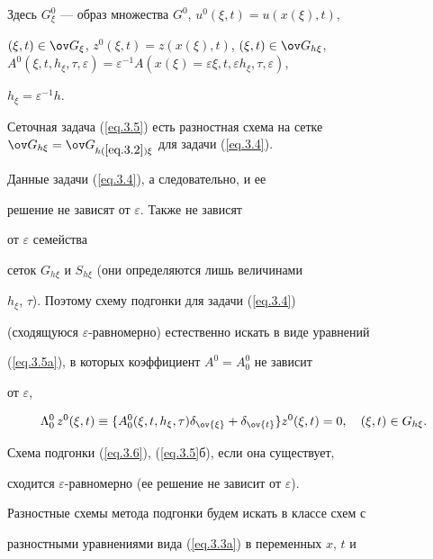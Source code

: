 Здесь $G^0_\xi$ --- образ множества $G^0$, $u^0(\xi, t)=u(x(\xi), t)$,


$(\xi, t)\in \ov G_\xi$, $z^0(\xi, t)=z(x(\xi), t)$, $(\xi, t)\in


\ov G_{h \xi}$, $A^0(\xi,t,h_\xi,\tau,\varepsilon)=\varepsilon^{-1}


A(x(\xi)=\varepsilon \xi,t, \varepsilon h_\xi, \tau,\varepsilon)$,


$h_\xi=\varepsilon^{-1} h$.


Сеточная задача (\ref{eq.3.5}) есть разностная схема на сетке $\ov G_{h


\xi}=\ov G_{h(\ref{eq.3.2})\xi}$ для задачи (\ref{eq.3.4}).





Данные задачи (\ref{eq.3.4}), а следовательно, и ее


решение не зависят от $\varepsilon$. Также не зависят


от $\varepsilon$ семейства


сеток $G_{h \xi}$ и $S_{h \xi}$ (они определяются лишь величинами


$h_\xi$, $\tau$). Поэтому схему подгонки для задачи (\ref{eq.3.4})


(сходящуюся $\varepsilon$-равномерно) естественно искать в виде уравнений


(\ref{eq.3.5a}), в которых коэффициент $A^0=A^0_0$ не зависит


от $\varepsilon$,


\begin{equation}


\label{eq.3.6}


\Lambda^0_0\, z^0(\xi, t)\equiv \{A^0_0(\xi, t, h_\xi, \tau)


\delta_{\ov{\xi}}+\delta_{\ov{t}}\} z^0(\xi, t)=0, \quad (\xi, t)\in


G_{h \xi}.


\end{equation}


Схема подгонки (\ref{eq.3.6}), (\ref{eq.3.5}б), если она существует,


сходится $\varepsilon$-равномерно (ее решение не зависит от $\varepsilon$).





Разностные схемы метода подгонки будем искать в классе схем с


разностными уравнениями вида (\ref{eq.3.3a}) в переменных $x$, $t$ и


